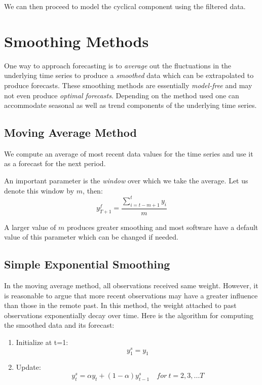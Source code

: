 \documentclass[]{book}
\theoremstyle{definition}
\theoremstyle{definition}
\theoremstyle{definition}
\theoremstyle{remark}
\begin{document}
We can then proceed to model the cyclical component using the filtered
data.

\hypertarget{smoothing-methods}{%
\chapter{Smoothing Methods}\label{smoothing-methods}}

One way to approach forecasting is to \emph{average} out the
fluctuations in the underlying time series to produce a \emph{smoothed}
data which can be extrapolated to produce forecasts. These smoothing
methods are essentially \emph{model-free} and may not even produce
\emph{optimal forecasts}. Depending on the method used one can
accommodate seasonal as well as trend components of the underlying time
series.

\hypertarget{moving-average-method}{%
\section{Moving Average Method}\label{moving-average-method}}

We compute an average of most recent data values for the time series and
use it as a forecast for the next period.

An important parameter is the \emph{window} over which we take the
average. Let us denote this window by \(m\), then: \begin{equation}
    y^f_{T+1}=\frac{\sum_{i=t-m+1}^{t}{y_i}}{m}
    \end{equation}

A larger value of \(m\) produces greater smoothing and most software
have a default value of this parameter which can be changed if needed.

\hypertarget{simple-exponential-smoothing}{%
\section{Simple Exponential
Smoothing}\label{simple-exponential-smoothing}}

In the moving average method, all observations received same weight.
However, it is reasonable to argue that more recent observations may
have a greater influence than those in the remote past. In this method,
the weight attached to past observations exponentially decay over time.
Here is the algorithm for computing the smoothed data and its forecast:

\begin{enumerate}
\def\labelenumi{\arabic{enumi}.}
\item
  Initialize at t=1: \[y_1^s=y_1\]
\item
  Update:
  \[y_{t}^{s}= \alpha y_t + (1-\alpha)y_{t-1}^{s}  \quad for \ t=2,3,...T\]
\end{enumerate}
\end{document}
